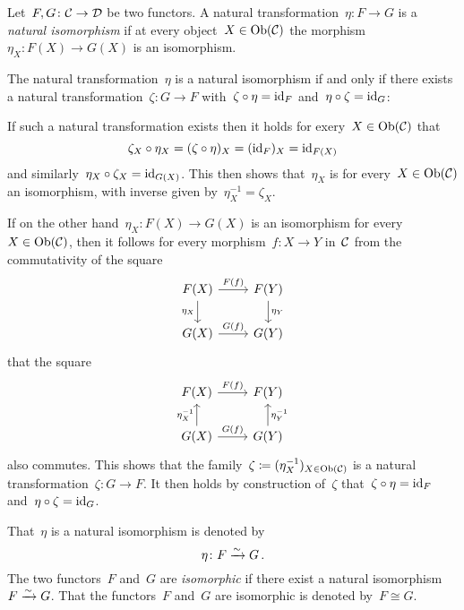 




\begin{remarkdefinition}
  Let~$F, G \colon \mathcal{C} \to \mathcal{D}$ be two functors.
  A natural transformation~$\eta \colon F \to G$ is a \emph{natural isomorphism} if at every object~$X \in \operatorname{Ob}(\mathcal{C})$ the morphism~$\eta_X \colon F(X) \to G(X)$ is an isomorphism.
  
  The natural transformation~$\eta$ is a natural isomorphism if and only if there exists a natural transformation~$\zeta \colon G \to F$ with~$\zeta \circ \eta = \operatorname{id}_F$ and~$\eta \circ \zeta = \operatorname{id}_G$:
  
  If such a natural transformation exists then it holds for exery~$X \in \operatorname{Ob}(\mathcal{C})$ that
  \[
      \zeta_X \circ \eta_X
    = (\zeta \circ \eta)_X
    = (\operatorname{id}_F)_X
    = \operatorname{id}_{F(X)}
  \]
  and similarly~$\eta_X \circ \zeta_X = \operatorname{id}_{G(X)}$.
  This then shows that~$\eta_X$ is for every~$X \in \operatorname{Ob}(\mathcal{C})$ an isomorphism, with inverse given by~$\eta_X^{-1} = \zeta_X$.
  
  If on the other hand~$\eta_X \colon F(X) \to G(X)$ is an isomorphism for every~$X \in \operatorname{Ob}(\mathcal{C})$, then it follows for every morphism~$f \colon X \to Y$ in~$\mathcal{C}$ from the commutativity of the square
  \[
    \begin{tikzcd}
        F(X)
        \arrow{r}[above]{F(f)}
        \arrow{d}[left]{\eta_X}
      & F(Y)
        \arrow{d}[right]{\eta_Y}
      \\
        G(X)
        \arrow{r}[above]{G(f)}
      & G(Y)
    \end{tikzcd}
  \]
  that the square
  \[
    \begin{tikzcd}
        F(X)
        \arrow{r}[above]{F(f)}
      & F(Y)
      \\
        G(X)
        \arrow{u}[left]{\eta_X^{-1}}
        \arrow{r}[above]{G(f)}
      & G(Y)
        \arrow{u}[right]{\eta_Y^{-1}}
    \end{tikzcd}
  \]
  also commutes.
  This shows that the family~$\zeta \coloneqq (\eta_X^{-1})_{X \in \operatorname{Ob}(\mathcal{C})}$ is a natural transformation~$\zeta \colon G \to F$.
  It then holds by construction of~$\zeta$ that~$\zeta \circ \eta = \operatorname{id}_F$ and~$\eta \circ \zeta = \operatorname{id}_G$.
  
  That~$\eta$ is a natural isomorphism is denoted by
  \[
                \eta
    \colon      F
    \xrightarrow{\sim}  G  \,.
  \]
  The two functors~$F$ and~$G$ are \emph{isomorphic} if there exist a natural isomorphism~$F \xrightarrow{\sim} G$.
  That the functors~$F$ and~$G$ are isomorphic is denoted by~$F \cong G$.
\end{remarkdefinition}


